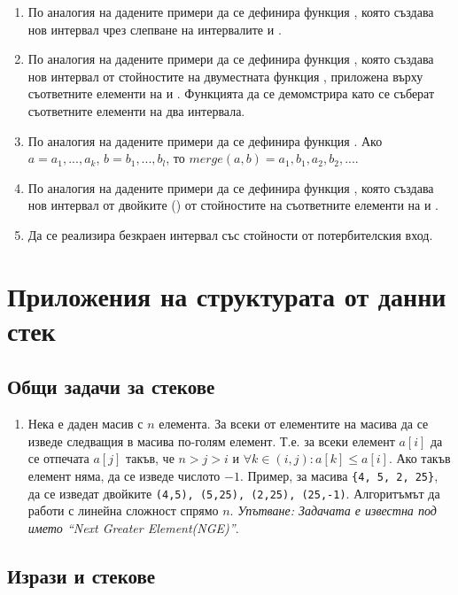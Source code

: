\begin{enumerate}[resume]
  \item По аналогия на дадените примери да се дефинира функция , която създава нов интервал чрез слепване на интервалите  и .
  \item По аналогия на дадените примери да се дефинира функция , която създава нов интервал от стойностите на двуместната функция , приложена върху съответните елементи на  и . Функцията да се демомстрира като се съберат съответните елементи на два интервала.
  \item По аналогия на дадените примери да се дефинира функция . Ако $a=a_1,...,a_k$, $b=b_1,...,b_l$, то $merge(a,b)=a_1,b_1,a_2,b_2,...$. 
  \item По аналогия на дадените примери да се дефинира функция , която създава нов интервал от двойките () от стойностите на съответните елементи на  и . 
  \item Да се реализира безкраен интервал със стойности от потербителския вход.
\end{enumerate}

\pagebreak
\section {Приложения на структурата от данни стек}

\subsection {Общи задачи за стекове}

\begin{enumerate}
  \item Нека е даден масив с $n$ елемента. За всеки от елементите на масива да се изведе следващия в масива по-голям елемент. Т.е. за всеки елемент $a[i]$ да се отпечата $a[j]$ такъв, че $n>j>i$ и $\forall k \in (i,j):a[k] \leq a[i]$. Ако такъв елемент няма, да се изведе числото $-1$. Пример, за масива \verb#{4, 5, 2, 25}#, да се изведат двойките \verb#(4,5), (5,25), (2,25), (25,-1)#. Алгоритъмът да работи с линейна сложност спрямо $n$. \emph{Упътване: Задачата е известна под името ``Next Greater Element(NGE)''}.
\end{enumerate}

\subsection {Изрази и стекове}

